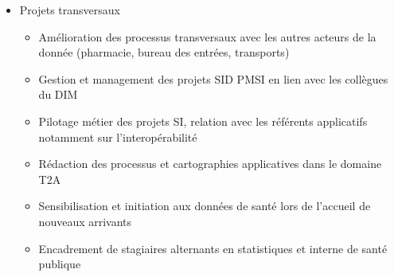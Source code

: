 \documentclass[11pt,a4paper]{moderncv}
\begin{document}
{\begin{itemize}[leftmargin=-0.5in]
\begin{itemize}[leftmargin=0.4in]
\item packages python \href{https://guillaumepressiat.github.io/pypmsi/}{pypmsi} et \href{https://github.com/GuillaumePressiat/refpymsi}{refpymsi}  pour lire et analyser les données et référentiels PMSI
\end{itemize}
\item {Projets transversaux}
\begin{itemize}[leftmargin=0.4in]
\item Amélioration des processus transversaux avec les autres acteurs de la donnée (pharmacie, bureau des entrées, transports)
\item Gestion et management des projets SID PMSI en lien avec les collègues du DIM
\item Pilotage métier des projets SI, relation avec les référents applicatifs notamment sur l'interopérabilité
\item Rédaction des processus et cartographies applicatives dans le domaine T2A
\item Sensibilisation et initiation aux données de santé lors de l’accueil de nouveaux arrivants
\item Encadrement de stagiaires alternants en statistiques et interne de santé publique
\end{itemize}
\end{itemize}}

 \vspace{5mm}
\end{document}
